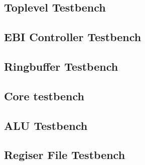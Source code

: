\clearpage
\subsection{Toplevel Testbench}\label{vhdl:tb-toplevel}


\clearpage
\subsection{EBI Controller Testbench}\label{vhdl:tb-ebi-controller}


\clearpage
\subsection{Ringbuffer Testbench}\label{vhdl:tb-ringbuffer}


\clearpage
\subsection{Core testbench}\label{vhdl:tb-core}



\clearpage
\subsection{ALU Testbench}\label{vhdl:tb-alu}


\clearpage
\subsection{Regiser File Testbench}\label{vhdl:tb-register-file}

